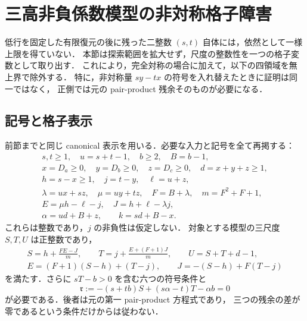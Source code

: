 \section{三高非負係数模型の非対称格子障害}
\label{hd23:section}

低行を固定した有限復元の後に残った二整数 $(s,t)$ 自体には，依然として一様上限を得ていない．
本節は探索範囲を拡大せず，尺度の整数性を一つの格子変数として取り出す．
これにより，完全対称の場合に加えて，以下の四領域を無上界で除外する．
特に，非対称量 $sy-tx$ の符号を入れ替えたときに証明は同一ではなく，
正側では元の pair-product 残余そのものが必要になる．

\subsection{記号と格子表示}

前節までと同じ canonical 表示を用いる．必要な入力と記号を全て再掲する：
\begin{equation}\label{hd23:data}
 \begin{gathered}
 s,t\ge1,\quad u=s+t-1,\quad b\ge2,\quad B=b-1,\\
 x=D_a\ge0,\quad y=D_b\ge0,\quad z=D_c\ge0,
 \quad d=x+y+z\ge1,\\
 h=s-x\ge1,\quad j=t-y,\quad \ell=u+z,\\
 \lambda=ux+sz,\quad \mu=uy+tz,\quad F=B+\lambda,
 \quad m=F^2+F+1,\\
 E=\mu h-\ell-j,\quad J=h+\ell-\lambda j,\\
 \alpha=ud+B+z,\qquad k=sd+B-x.
 \end{gathered}
\end{equation}
これらは整数であり，$j$ の非負性は仮定しない．
対象とする模型の三尺度 $S,T,U$ は正整数であり，
\begin{equation}\label{hd23:reconstruction}
 \begin{gathered}
 S=h+\frac{FE-J}{m},\qquad
 T=j+\frac{E+(F+1)J}{m},\qquad U=S+T+d-1,\\
 E=(F+1)(S-h)+(T-j),\qquad
 J=-(S-h)+F(T-j)
 \end{gathered}
\end{equation}
を満たす．さらに $sT-b>0$ を含む六つの符号条件と
\begin{equation}\label{hd23:original-residual}
 \mathfrak r:=-(s+tb)S+(s\alpha-t)T-\alpha b=0
\end{equation}
が必要である．後者は元の第一 pair-product 方程式であり，
三つの残余の差が零であるという条件だけからは従わない．

